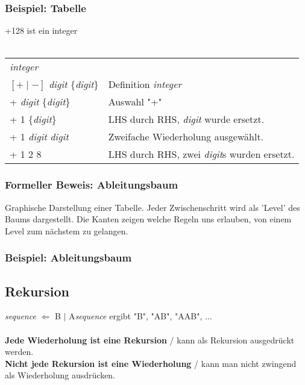 \documentclass[12pt,a4paper]{article}
\begin{document}
\subsubsection*{Beispiel: Tabelle}
+128 ist ein integer\\\\
\begin{tabularx}{\linewidth}{l X}
\textit{integer} & \\
$[+\mid-]$ \textit{digit} \{\textit{digit}\} & Definition \textit{integer}\\
+ \textit{digit} \{\textit{digit}\} & Auswahl "+"\\
+ 1 \{\textit{digit}\} & LHS durch RHS, \textit{digit} wurde ersetzt.\\
+ 1 \textit{digit} \textit{digit} & Zweifache Wiederholung ausgewählt.\\
+ 1 2 8 & LHS durch RHS, zwei \textit{digit}s wurden ersetzt.
\end{tabularx}
\subsubsection{Formeller Beweis: Ableitungsbaum}
Graphische Darstellung einer Tabelle. Jeder Zwischenschritt wird als 'Level' des Baums dargestellt. Die Kanten zeigen welche Regeln uns erlauben, von einem Level zum nächstem zu gelangen.
\subsubsection{Beispiel: Ableitungsbaum} %
\subsection{Rekursion}
\textit{sequence} $\Leftarrow$ B $\mid$ A\textit{sequence} ergibt "B", "AB", "AAB", $\hdots$\\\\
\textbf{Jede Wiederholung ist eine Rekursion} / kann als Rekursion ausgedrückt werden.\\
\textbf{Nicht jede Rekursion ist eine Wiederholung} / kann man nicht zwingend als Wiederholung ausdrücken.
\end{document}
